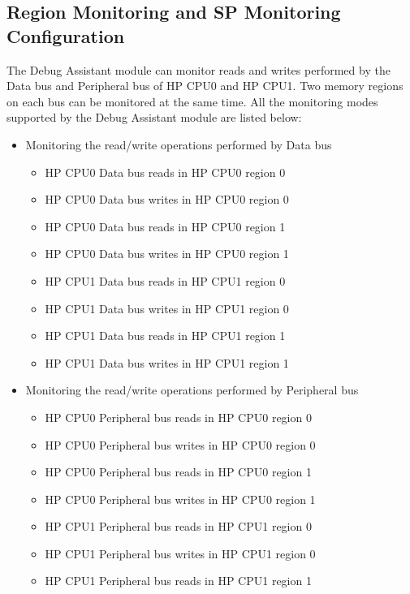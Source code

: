 \documentclass[main\_\_EN.tex]{subfiles}
\begin{document}
\subsection{Region Monitoring and SP Monitoring Configuration}

The Debug Assistant module can monitor reads and writes performed by the Data bus and Peripheral bus of HP CPU0 and HP CPU1. Two memory regions on each bus can be monitored at the same time. All the monitoring modes supported by the Debug Assistant module are listed below:

\begin{itemize}
    \item Monitoring the read/write operations performed by Data bus
        \begin{itemize}
            \item HP CPU0 Data bus reads in HP CPU0 region 0
            \item HP CPU0 Data bus writes in HP CPU0 region 0
            \item HP CPU0 Data bus reads in HP CPU0 region 1
            \item HP CPU0 Data bus writes in HP CPU0 region 1
            \item HP CPU1 Data bus reads in HP CPU1 region 0
            \item HP CPU1 Data bus writes in HP CPU1 region 0
            \item HP CPU1 Data bus reads in HP CPU1 region 1
            \item HP CPU1 Data bus writes in HP CPU1 region 1
        \end{itemize}
    \item Monitoring the read/write operations performed by Peripheral bus
        \begin{itemize}
            \item HP CPU0 Peripheral bus reads in HP CPU0 region 0
            \item HP CPU0 Peripheral bus writes in HP CPU0 region 0
            \item HP CPU0 Peripheral bus reads in HP CPU0 region 1
            \item HP CPU0 Peripheral bus writes in HP CPU0 region 1
            \item HP CPU1 Peripheral bus reads in HP CPU1 region 0
            \item HP CPU1 Peripheral bus writes in HP CPU1 region 0
            \item HP CPU1 Peripheral bus reads in HP CPU1 region 1

\end{itemize}
\end{itemize}
\end{document}
